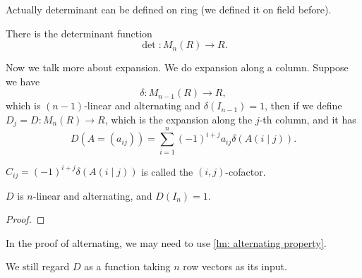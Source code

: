 Actually determinant can be defined on ring (we defined it on field before). 
\begin{theorem}
    There is the determinant function 
    \[
        \det : M_n(R) \to R.
    \]
\end{theorem}

Now we talk more about expansion. We do expansion along a column. 
Suppose we have 
\[
    \delta : M_{n-1}(R) \to R,
\]which is \((n-1)\)-linear and alternating and \(\delta (I_{n-1}) = 1\), then if we define \(D_j = D: M_n(R) \to R\), which is the expansion along the \(j\)-th column, and it has 
\[
    D(A = (a_{ij})) = \sum_{i=1}^n (-1)^{i+j} a_{ij} \delta \left( A(i \mid j) \right).  
\] 

\begin{note}
    \(C_{ij} = (-1)^{i+j} \delta \left( A(i \mid j) \right)  \) is called the \((i, j)\)-cofactor. 
\end{note}

\begin{theorem}
    \(D\) is \(n\)-linear and alternating, and \(D(I_n) = 1\).   
\end{theorem}
\begin{proof}
\end{proof}
\begin{note}
    In the proof of alternating, we may need to use \autoref{lm: alternating property}. 
\end{note}
\begin{note}
    We still regard \(D\) as a function taking \(n\) row vectors as its input.
\end{note}

